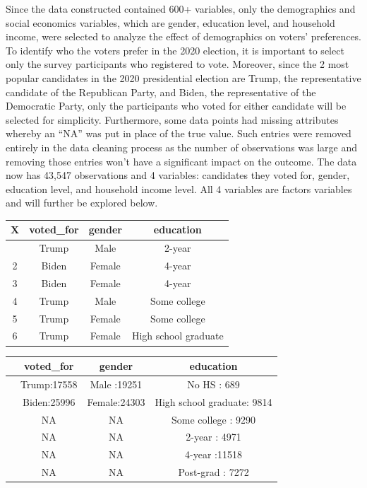 \documentclass[
  letterpaper,
  DIV=11,
  numbers=noendperiod]{scrartcl}
\begin{document}
Since the data constructed contained 600+ variables, only the
demographics and social economics variables, which are gender, education
level, and household income, were selected to analyze the effect of
demographics on voters' preferences. To identify who the voters prefer
in the 2020 election, it is important to select only the survey
participants who registered to vote. Moreover, since the 2 most popular
candidates in the 2020 presidential election are Trump, the
representative candidate of the Republican Party, and Biden, the
representative of the Democratic Party, only the participants who voted
for either candidate will be selected for simplicity. Furthermore, some
data points had missing attributes whereby an ``NA'' was put in place of
the true value. Such entries were removed entirely in the data cleaning
process as the number of observations was large and removing those
entries won't have a significant impact on the outcome. The data now has
43,547 observations and 4 variables: candidates they voted for, gender,
education level, and household income level. All 4 variables are factors
variables and will further be explored below.

\begin{longtable}[]{@{}cccc@{}}
\toprule\noalign{}
X & voted\_for & gender & education \\
\midrule\noalign{}
\endhead
\bottomrule\noalign{}
\endlastfoot
1 & Trump & Male & 2-year \\
2 & Biden & Female & 4-year \\
3 & Biden & Female & 4-year \\
4 & Trump & Male & Some college \\
5 & Trump & Female & Some college \\
6 & Trump & Female & High school graduate \\
\end{longtable}

\begin{longtable}[]{@{}lccc@{}}
\toprule\noalign{}
& voted\_for & gender & education \\
\midrule\noalign{}
\endhead
\bottomrule\noalign{}
\endlastfoot
& Trump:17558 & Male :19251 & No HS : 689 \\
& Biden:25996 & Female:24303 & High school graduate: 9814 \\
& NA & NA & Some college : 9290 \\
& NA & NA & 2-year : 4971 \\
& NA & NA & 4-year :11518 \\
& NA & NA & Post-grad : 7272 \\
\end{longtable}
\end{document}

